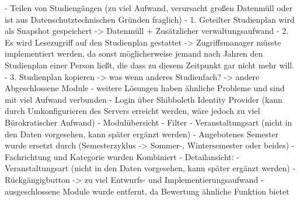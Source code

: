 - Teilen von Studiengängen (zu viel Aufwand, verursacht großen Datenmüll oder ist aus Datenschutztechnischen Gründen fraglich)
	- 1. Geteilter Studienplan wird als Snapshot gespeichert -> Datenmüll + Zusätzlicher verwaltungsaufwand
	- 2. Es wird Lesezugriff auf den Studienplan gestattet -> Zugriffsmanager müsste implementiert werden, da sonst möglicherweise jemand nach Jahren den Studienplan einer Person ließt, die dass zu diesem Zeitpunkt gar nicht mehr will.
	- 3. Studienplan kopieren -> was wenn anderes Studienfach? -> andere Abgeschlossene Module
	- weitere Lösungen haben ähnliche Probleme und sind mit viel Aufwand verbunden
- Login über Shibboleth Identity Provider (kann durch Umkonfigurieren des Servers erreicht werden, wäre jedoch zu viel Bürokratischer Aufwand)
- Modulübersicht
	- Filter 
		- Veranstaltungsart (nicht in den Daten vorgesehen, kann später ergänzt werden)
		- Angebotenes Semester wurde ersetzt durch (Semesterzyklus -> Sommer-, Wintersemester oder beides)
		- Fachrichtung und Kategorie wurden Kombiniert
	- Detailansicht:
		- Veranstaltungsart (nicht in den Daten vorgesehen, kann später ergänzt werden)
- Rückgängigbutton -> zu viel Entwurfs- und Implementierungsaufwand
- ausgeschlossene Module wurde entfernt, da Bewertung ähnliche Funktion bietet